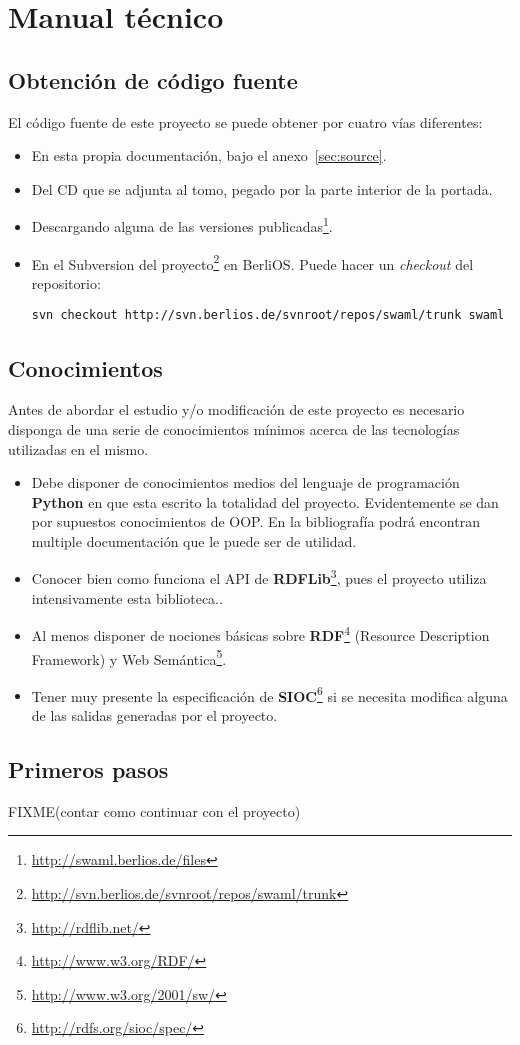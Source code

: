 
\section{Manual técnico}

\subsection*{Obtención de código fuente}

El código fuente de este proyecto se puede obtener por cuatro vías diferentes:

\begin{itemize}
  \item En esta propia documentación, bajo el anexo~\ref{sec:source}.
  \item Del CD que se adjunta al tomo, pegado por la parte interior
	de la portada.
  \item Descargando alguna de las versiones
	publicadas\footnote{\url{http://swaml.berlios.de/files}}.
  \item En el Subversion del proyecto\footnote{\url{http://svn.berlios.de/svnroot/repos/swaml/trunk}} 
	en BerliOS. Puede hacer un \emph{checkout} del repositorio:
	\begin{center}
	 \texttt{svn checkout http://svn.berlios.de/svnroot/repos/swaml/trunk swaml}
	\end{center}
\end{itemize}

\subsection*{Conocimientos}

Antes de abordar el estudio y/o modificación de este proyecto es necesario 
disponga de una serie de conocimientos mínimos acerca de las tecnologías
utilizadas en el mismo.

\begin{itemize}
  \item Debe disponer de conocimientos medios del lenguaje de programación 
	\textbf{Python} en que esta escrito la totalidad del proyecto. 
	Evidentemente se dan por supuestos conocimientos de OOP. En la
	bibliografía podrá encontran multiple documentación que le puede ser
	de utilidad.
  \item Conocer bien como funciona el API de 
	\textbf{RDFLib}\footnote{\url{http://rdflib.net/}}, pues el proyecto
	utiliza intensivamente esta biblioteca..
  \item Al menos disponer de nociones básicas sobre 
	\textbf{RDF}\footnote{\url{http://www.w3.org/RDF/}} (Resource Description 
	Framework) y Web Semántica\footnote{\url{http://www.w3.org/2001/sw/}}.
  \item Tener muy presente la especificación de 
	\textbf{SIOC}\footnote{\url{http://rdfs.org/sioc/spec/}} si se necesita
	modifica alguna de las salidas generadas por el proyecto.
\end{itemize}

\subsection*{Primeros pasos}

FIXME(contar como continuar con el proyecto)
